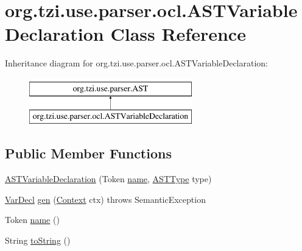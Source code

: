 \hypertarget{classorg_1_1tzi_1_1use_1_1parser_1_1ocl_1_1_a_s_t_variable_declaration}{\section{org.\-tzi.\-use.\-parser.\-ocl.\-A\-S\-T\-Variable\-Declaration Class Reference}
\label{classorg_1_1tzi_1_1use_1_1parser_1_1ocl_1_1_a_s_t_variable_declaration}
}
Inheritance diagram for org.\-tzi.\-use.\-parser.\-ocl.\-A\-S\-T\-Variable\-Declaration\-:\begin{figure}[H]
\begin{center}
\leavevmode
\includegraphics[height=2.000000cm]{classorg_1_1tzi_1_1use_1_1parser_1_1ocl_1_1_a_s_t_variable_declaration}
\end{center}
\end{figure}
\subsection*{Public Member Functions}
\begin{DoxyCompactItemize}
\item 
\hyperlink{classorg_1_1tzi_1_1use_1_1parser_1_1ocl_1_1_a_s_t_variable_declaration_a1a68d44c30d3ace5891803d27ed09d4c}{A\-S\-T\-Variable\-Declaration} (Token \hyperlink{classorg_1_1tzi_1_1use_1_1parser_1_1ocl_1_1_a_s_t_variable_declaration_a1e9d590050832c738805c42a7ac01538}{name}, \hyperlink{classorg_1_1tzi_1_1use_1_1parser_1_1ocl_1_1_a_s_t_type}{A\-S\-T\-Type} type)
\item 
\hyperlink{classorg_1_1tzi_1_1use_1_1uml_1_1ocl_1_1expr_1_1_var_decl}{Var\-Decl} \hyperlink{classorg_1_1tzi_1_1use_1_1parser_1_1ocl_1_1_a_s_t_variable_declaration_aeb0e55ef142c701066218a0098df4574}{gen} (\hyperlink{classorg_1_1tzi_1_1use_1_1parser_1_1_context}{Context} ctx)  throws Semantic\-Exception      
\item 
Token \hyperlink{classorg_1_1tzi_1_1use_1_1parser_1_1ocl_1_1_a_s_t_variable_declaration_a1e9d590050832c738805c42a7ac01538}{name} ()
\item 
String \hyperlink{classorg_1_1tzi_1_1use_1_1parser_1_1ocl_1_1_a_s_t_variable_declaration_a41fa9b576cfd7270d1414cb5302a4f2a}{to\-String} ()
\end{DoxyCompactItemize}



